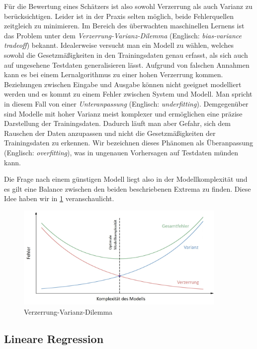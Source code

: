 Für die Bewertung eines Schätzers ist also sowohl Verzerrung als auch Varianz zu berücksichtigen. Leider ist in der Praxis selten möglich, beide Fehlerquellen zeitgleich zu minimieren. Im Bereich des überwachten maschinellen Lernens ist das Problem unter dem \textit{Verzerrung-Varianz-Dilemma} (Englisch: \textit{bias-variance tradeoff}) bekannt. Idealerweise versucht man ein Modell zu wählen, welches sowohl die Gesetzmäßigkeiten in den Trainingsdaten genau erfasst, als sich auch auf ungesehene Testdaten generalisieren lässt.
Aufgrund von falschen Annahmen kann es bei einem Lernalgorithmus zu einer hohen Verzerrung kommen. Beziehungen zwischen Eingabe und Ausgabe können nicht geeignet modelliert werden und es kommt zu einem Fehler zwischen System und Modell. Man spricht in diesem Fall von einer \textit{Unteranpassung} (Englisch: \textit{underfitting}).
Demgegenüber sind Modelle mit hoher Varianz meist komplexer und ermöglichen eine präzise Darstellung der Trainingsdaten. Dadurch läuft man aber Gefahr, sich dem Rauschen der Daten anzupassen und nicht die Gesetzmäßigkeiten der Trainingsdaten zu erkennen. Wir bezeichnen dieses Phänomen als Überanpassung (Englisch: \textit{overfitting}), was in ungenauen Vorhersagen auf Testdaten münden kann. 

Die Frage nach einem günstigen Modell liegt also in der Modellkomplexität und es gilt eine Balance zwischen den beiden beschriebenen Extrema zu finden. Diese Idee haben wir in \ref{bias_variance_tradeoff} veranschaulicht.

\begin{figure}
\centering
\includegraphics[width = 0.9\textwidth]{figures/bias_variance_tradeoff_labeled.jpg}
\caption{Verzerrung-Varianz-Dilemma}
\label{bias_variance_tradeoff}
\end{figure}

\subsection{Lineare Regression} \cite{hastie_elements}

